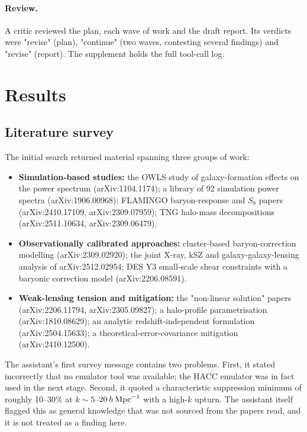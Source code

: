 \documentclass[11pt,a4paper]{article}
\begin{document}
\paragraph{Review.} A critic reviewed the plan, each wave of work and the draft report. Its verdicts were "revise" (plan), "continue" (two waves, contesting several findings) and "revise" (report). The supplement holds the full tool-call log.

\section{Results}

\subsection{Literature survey}

The initial search returned material spanning three groups of work:
\begin{itemize}
\item \textbf{Simulation-based studies:} the OWLS study of galaxy-formation effects on the power spectrum (arXiv:1104.1174); a library of 92 simulation power spectra (arXiv:1906.00968); FLAMINGO baryon-response and $S_8$ papers (arXiv:2410.17109, arXiv:2309.07959); TNG halo-mass decompositions (arXiv:2511.10634, arXiv:2309.06479).
\item \textbf{Observationally calibrated approaches:} cluster-based baryon-correction modelling (arXiv:2309.02920); the joint X-ray, kSZ and galaxy-galaxy-lensing analysis of arXiv:2512.02954; DES Y3 small-scale shear constraints with a baryonic correction model (arXiv:2206.08591).
\item \textbf{Weak-lensing tension and mitigation:} the "non-linear solution" papers (arXiv:2206.11794, arXiv:2305.09827); a halo-profile parametrisation (arXiv:1810.08629); an analytic redshift-independent formulation (arXiv:2504.15633); a theoretical-error-covariance mitigation (arXiv:2410.12500).
\end{itemize}

The assistant's first survey message contains two problems. First, it stated incorrectly that no emulator tool was available; the HACC emulator was in fact used in the next stage. Second, it quoted a characteristic suppression minimum of roughly 10--30\% at $k\sim5$--$20\,h\,{\rm Mpc}^{-1}$ with a high-$k$ upturn. The assistant itself flagged this as general knowledge that was not sourced from the papers read, and it is not treated as a finding here.
\end{document}
